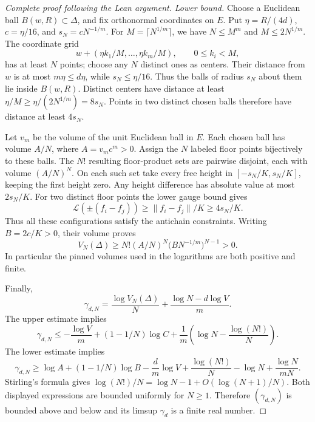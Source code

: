 \begin{proof}[Complete proof following the Lean argument]
\emph{Lower bound.}
Choose a Euclidean ball \(B(w,R)\subset\Delta\), and fix orthonormal
coordinates on \(E\). Put \(\eta=R/(4d)\), \(c=\eta/16\), and
\(s_N=cN^{-1/m}\).
For \(M=\lceil N^{1/m}\rceil\), we have
\(N\le M^m\) and \(M\le2N^{1/m}\).
The coordinate grid
\[
          w+(\eta k_1/M,\ldots,\eta k_m/M),
          \qquad 0\le k_i<M,
\]
has at least \(N\) points; choose any \(N\) distinct ones as centers.
Their distance from \(w\) is at most \(m\eta\le d\eta\), while
\(s_N\le\eta/16\). Thus the balls of radius \(s_N\) about them lie
inside \(B(w,R)\).
Distinct centers have distance at least
\(\eta/M\ge\eta/(2N^{1/m})=8s_N\). Points in two distinct chosen balls
therefore have distance at least \(4s_N\).

Let \(v_m\) be the volume of the unit Euclidean ball in \(E\).
Each chosen ball has volume \(A/N\), where \(A=v_m c^m>0\).
Assign the \(N\) labeled floor points bijectively to these balls.
The \(N!\) resulting floor-product sets are pairwise disjoint, each
with volume \((A/N)^N\).
On each such set take every free height in
\([-s_N/K,s_N/K]\), keeping the first height zero.
Any height difference has absolute value at most \(2s_N/K\).
For two distinct floor points the lower gauge bound gives
\[
       \mathcal L(\pm(f_i-f_j))
            \ge \|f_i-f_j\|/K\ge4s_N/K.
\]
Thus all these configurations satisfy the antichain constraints.
Writing \(B=2c/K>0\), their volume proves
\[
       V_N(\Delta)\ge
          N!(A/N)^N\bigl(BN^{-1/m}\bigr)^{N-1}>0.
\]
In particular the pinned volumes used in the logarithms are both positive
and finite.

Finally,
\[
 \gamma_{d,N}
       =\frac{\log V_N(\Delta)}N+\frac{\log N-d\log V}{m}.
\]
The upper estimate implies
\[
 \gamma_{d,N}\le
       -\frac{\log V}{m}
       +(1-1/N)\log C
       +\frac1m\left(\log N-\frac{\log(N!)}N\right).
\]
The lower estimate implies
\[
 \gamma_{d,N}\ge
       \log A+(1-1/N)\log B-\frac d m\log V
       +\frac{\log(N!)}N-\log N+\frac{\log N}{mN}.
\]
Stirling's formula gives
\(\log(N!)/N=\log N-1+O(\log(N+1)/N)\).
Both displayed expressions are bounded uniformly for \(N\ge1\).
Therefore \((\gamma_{d,N})\) is bounded above and below and its limsup
\(\gamma_d\) is a finite real number.
\end{proof}

